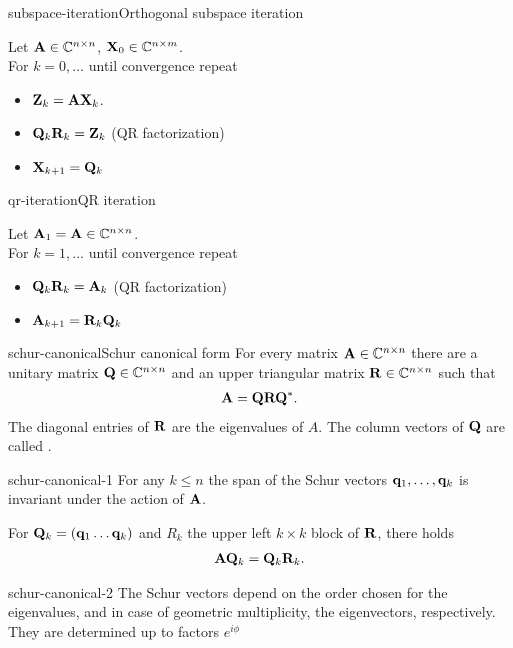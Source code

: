 \begin{Algorithm*}{subspace-iteration}{Orthogonal subspace iteration}

  Let $\mathbf A\in\mathbb C^{n\times n}$, $\mathbf X_0 \in \mathbb C^{n\times m}$.\\
  For $k=0,\ldots$ until convergence repeat
  \begin{itemize}
  \item $\mathbf Z_k = \mathbf A \mathbf X_k$.
  \item $\mathbf Q_k\mathbf R_k = \mathbf Z_k$ (QR factorization)
  \item $\mathbf X_{k+1} = \mathbf Q_k$
  \end{itemize}
\end{Algorithm*}

\begin{Algorithm*}{qr-iteration}{QR iteration}
  
  Let $\mathbf A_1 = \mathbf A\in\mathbb C^{n\times n}$.\\
  For $k=1,\ldots$ until convergence repeat
  \begin{itemize}
  \item $\mathbf Q_k\mathbf R_k = \mathbf A_k$ (QR factorization)
  \item $\mathbf A_{k+1} = \mathbf R_k\mathbf Q_k$
  \end{itemize}
\end{Algorithm*}

\begin{Theorem*}{schur-canonical}{Schur canonical form}
  For every matrix $\mathbf A\in\mathbb C^{n\times n}$ there are a unitary matrix
  $\mathbf Q\in\mathbb C^{n\times n}$ and an upper triangular matrix $\mathbf R\in\mathbb C^{n\times n}$ such
  that
  \begin{gather}
    \mathbf A = \mathbf Q \mathbf R \mathbf Q^*.
  \end{gather}
  The diagonal entries of $\mathbf R$ are the eigenvalues of $A$. The
  column vectors of $\mathbf Q$ are called .
\end{Theorem*}

\begin{Lemma}{schur-canonical-1}
  For any $k\le n$ the span of the Schur vectors
  $\mathbf q_1,\dots,\mathbf q_k$ is invariant under the action of $\mathbf A$.

  For $\mathbf Q_k = (\mathbf q_1\dots\mathbf q_k)$ and $R_k$ the upper left $k\times k$ block of $\mathbf R$, there holds
  \begin{gather}
    \mathbf A\mathbf Q_k = \mathbf Q_k \mathbf R_k.
  \end{gather}
\end{Lemma}

\begin{Lemma}{schur-canonical-2}
  The Schur vectors depend on the order chosen for the eigenvalues,
  and in case of geometric multiplicity, the eigenvectors,
  respectively. They are determined up to factors $e^{i\phi}$
\end{Lemma}


